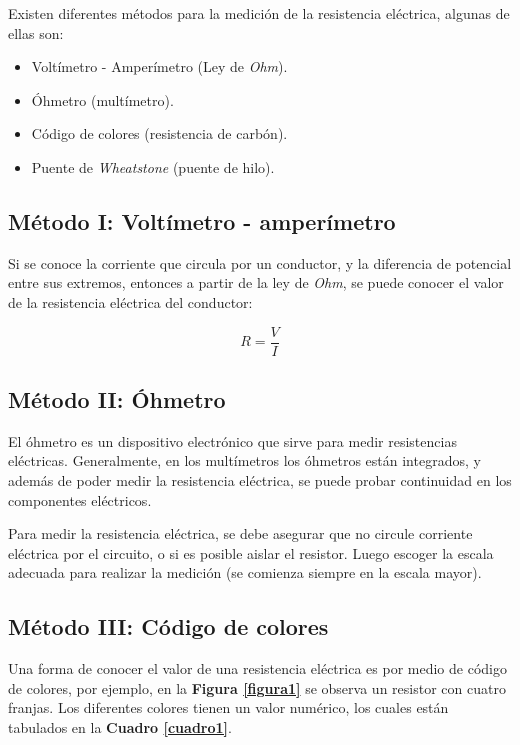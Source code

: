 \documentclass[letter,11pt]{article}
\begin{document}
Existen diferentes métodos para la medición de la resistencia eléctrica, algunas
de ellas son:

\begin{itemize}
    \item Voltímetro - Amperímetro (Ley de \emph{Ohm}).
    \item Óhmetro (multímetro).
    \item Código de colores (resistencia de carbón).
    \item Puente de \emph{Wheatstone} (puente de hilo).
\end{itemize}

\subsection{Método I: Voltímetro - amperímetro}
Si se conoce la corriente que circula por un conductor, y la diferencia de
potencial entre sus extremos, entonces a partir de la ley de \emph{Ohm}, se
puede conocer el valor de la resistencia eléctrica del conductor:

\begin{equation}
    R = \frac{V}{I}
\label{ohm}
\end{equation}

\subsection{Método II: Óhmetro}
El óhmetro es un dispositivo electrónico que sirve para medir resistencias
eléctricas. Generalmente, en los multímetros los óhmetros están integrados, y
además de poder medir la resistencia eléctrica, se puede probar continuidad en
los componentes eléctricos.

Para medir la resistencia eléctrica, se debe asegurar que no circule corriente
eléctrica por el circuito, o si es posible aislar el resistor. Luego escoger la
escala adecuada para realizar la medición (se comienza siempre en la escala
mayor).

\subsection{Método III: Código de colores}
Una forma de conocer el valor de una resistencia eléctrica es por medio de
código de colores, por ejemplo, en la \textbf{Figura \ref{figura1}} se observa
un resistor con cuatro franjas. Los diferentes colores tienen un valor numérico,
los cuales están tabulados en la \textbf{Cuadro \ref{cuadro1}}.
\end{document}
